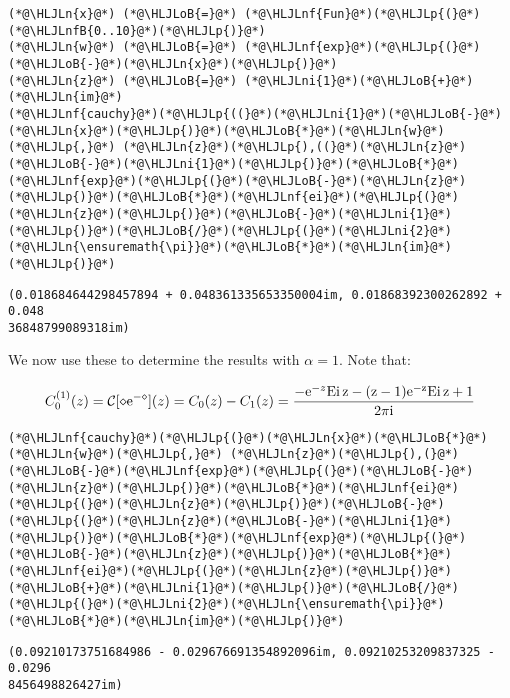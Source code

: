 \documentclass[12pt,landscape]{article}
\newcommand{\HLJLn}[1]{#1}
\newcommand{\HLJLnf}[1]{\textcolor[RGB]{66,102,213}{#1}}
\newcommand{\HLJLnfB}[1]{\textcolor[RGB]{59,151,46}{#1}}
\newcommand{\HLJLni}[1]{\textcolor[RGB]{59,151,46}{#1}}
\newcommand{\HLJLoB}[1]{\textcolor[RGB]{102,102,102}{\textbf{#1}}}
\newcommand{\HLJLp}[1]{#1}
\def\I{ {\rm i} }
\def\E{ {\rm e} }
\def\CC{ {\cal C} }
\def\Ei{ {\rm Ei}\, }
\def\Ei{\rm Ei\,}
\begin{document}
{\begin{lstlisting}
(*@\HLJLn{x}@*) (*@\HLJLoB{=}@*) (*@\HLJLnf{Fun}@*)(*@\HLJLp{(}@*)(*@\HLJLnfB{0..10}@*)(*@\HLJLp{)}@*)
(*@\HLJLn{w}@*) (*@\HLJLoB{=}@*) (*@\HLJLnf{exp}@*)(*@\HLJLp{(}@*)(*@\HLJLoB{-}@*)(*@\HLJLn{x}@*)(*@\HLJLp{)}@*)
(*@\HLJLn{z}@*) (*@\HLJLoB{=}@*) (*@\HLJLni{1}@*)(*@\HLJLoB{+}@*)(*@\HLJLn{im}@*)
(*@\HLJLnf{cauchy}@*)(*@\HLJLp{((}@*)(*@\HLJLni{1}@*)(*@\HLJLoB{-}@*)(*@\HLJLn{x}@*)(*@\HLJLp{)}@*)(*@\HLJLoB{*}@*)(*@\HLJLn{w}@*)(*@\HLJLp{,}@*) (*@\HLJLn{z}@*)(*@\HLJLp{),((}@*)(*@\HLJLn{z}@*)(*@\HLJLoB{-}@*)(*@\HLJLni{1}@*)(*@\HLJLp{)}@*)(*@\HLJLoB{*}@*)(*@\HLJLnf{exp}@*)(*@\HLJLp{(}@*)(*@\HLJLoB{-}@*)(*@\HLJLn{z}@*)(*@\HLJLp{)}@*)(*@\HLJLoB{*}@*)(*@\HLJLnf{ei}@*)(*@\HLJLp{(}@*)(*@\HLJLn{z}@*)(*@\HLJLp{)}@*)(*@\HLJLoB{-}@*)(*@\HLJLni{1}@*)(*@\HLJLp{)}@*)(*@\HLJLoB{/}@*)(*@\HLJLp{(}@*)(*@\HLJLni{2}@*)(*@\HLJLn{\ensuremath{\pi}}@*)(*@\HLJLoB{*}@*)(*@\HLJLn{im}@*)(*@\HLJLp{)}@*)
\end{lstlisting}

\begin{lstlisting}
(0.018684644298457894 + 0.048361335653350004im, 0.01868392300262892 + 0.048
36848799089318im)
\end{lstlisting}


We now use these to determine the results with $\alpha = 1$. Note that:

\[
C_0^{(1)}(z) = \CC[\diamond \E^{-\diamond}](z) =C_0(z) - C_1(z) = { -\E^{-z} \Ei z - (z-1) \E^{-z} \Ei z +1 \over 2 \pi \I}
\]

\begin{lstlisting}
(*@\HLJLnf{cauchy}@*)(*@\HLJLp{(}@*)(*@\HLJLn{x}@*)(*@\HLJLoB{*}@*)(*@\HLJLn{w}@*)(*@\HLJLp{,}@*) (*@\HLJLn{z}@*)(*@\HLJLp{),(}@*)(*@\HLJLoB{-}@*)(*@\HLJLnf{exp}@*)(*@\HLJLp{(}@*)(*@\HLJLoB{-}@*)(*@\HLJLn{z}@*)(*@\HLJLp{)}@*)(*@\HLJLoB{*}@*)(*@\HLJLnf{ei}@*)(*@\HLJLp{(}@*)(*@\HLJLn{z}@*)(*@\HLJLp{)}@*)(*@\HLJLoB{-}@*)(*@\HLJLp{(}@*)(*@\HLJLn{z}@*)(*@\HLJLoB{-}@*)(*@\HLJLni{1}@*)(*@\HLJLp{)}@*)(*@\HLJLoB{*}@*)(*@\HLJLnf{exp}@*)(*@\HLJLp{(}@*)(*@\HLJLoB{-}@*)(*@\HLJLn{z}@*)(*@\HLJLp{)}@*)(*@\HLJLoB{*}@*)(*@\HLJLnf{ei}@*)(*@\HLJLp{(}@*)(*@\HLJLn{z}@*)(*@\HLJLp{)}@*)(*@\HLJLoB{+}@*)(*@\HLJLni{1}@*)(*@\HLJLp{)}@*)(*@\HLJLoB{/}@*)(*@\HLJLp{(}@*)(*@\HLJLni{2}@*)(*@\HLJLn{\ensuremath{\pi}}@*)(*@\HLJLoB{*}@*)(*@\HLJLn{im}@*)(*@\HLJLp{)}@*)
\end{lstlisting}

\begin{lstlisting}
(0.09210173751684986 - 0.029676691354892096im, 0.09210253209837325 - 0.0296
8456498826427im)
\end{lstlisting}


}
\end{document}
